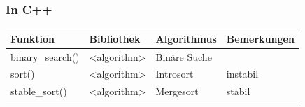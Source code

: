 \subsubsection{In C++}
\begin{tabular}{|llll|}
\hline
\textbf{Funktion} & \textbf{Bibliothek} & \textbf{Algorithmus} & \textbf{Bemerkungen} \\
\hline
binary\_search() & \textless algorithm\textgreater & Binäre Suche & \\
\hline
sort() & \textless algorithm\textgreater & Introsort & instabil \\
\hline
stable\_sort() & \textless algorithm\textgreater & Mergesort & stabil \\
\hline
\end{tabular}
